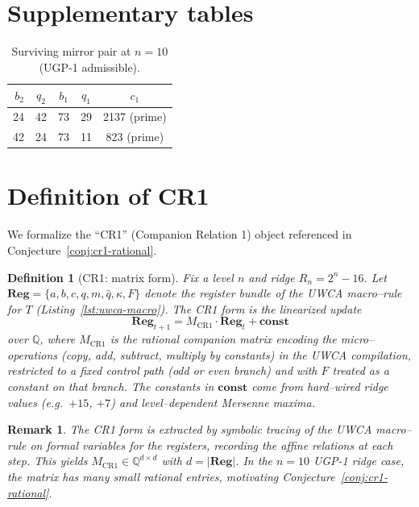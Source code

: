 \documentclass[12pt]{article}
\newtheorem{definition}[theorem]{Definition}
\newtheorem{remark}[theorem]{Remark}
\numberwithin{equation}{section}
\begin{document}
\section{Supplementary tables}\label{app:tables}
\begin{table}[h]
\centering
\renewcommand{\arraystretch}{1.08}
\begin{tabular}{@{}rcccc@{}}
\toprule
$b_2$ & $q_2$ & $b_1$ & $q_1$ & $c_1$ \\
\midrule
24 & 42 & 73 & 29 & 2137 (prime) \\
42 & 24 & 73 & 11 & \phantom{0}823 (prime) \\
\bottomrule
\end{tabular}
\caption{Surviving mirror pair at $n=10$ (UGP-1 admissible).}
\end{table}

\section{Definition of CR1}\label{app:cr1-def}
We formalize the ``CR1'' (Companion Relation 1) object referenced in Conjecture~\ref{conj:cr1-rational}.

\begin{definition}[CR1: matrix form]
Fix a level $n$ and ridge $R_n=2^n-16$. Let $\mathbf{Reg}=\{a,b,c,q,m,\hat{q},\kappa,F\}$ denote the register bundle of the UWCA macro–rule for $T$ (Listing~\ref{lst:uwca-macro}). The \emph{CR1} form is the linearized update
\[
\mathbf{Reg}_{t+1} = M_{\mathrm{CR1}} \cdot \mathbf{Reg}_t + \mathbf{const}
\]
over $\mathbb{Q}$, where $M_{\mathrm{CR1}}$ is the rational companion matrix encoding the micro–operations (copy, add, subtract, multiply by constants) in the UWCA compilation, restricted to a fixed control path (odd or even branch) and with $F$ treated as a constant on that branch. The constants in $\mathbf{const}$ come from hard–wired ridge values (e.g.\ $+15$, $+7$) and level–dependent Mersenne maxima.
\end{definition}

\begin{remark}
The CR1 form is extracted by symbolic tracing of the UWCA macro–rule on formal variables for the registers, recording the affine relations at each step. This yields $M_{\mathrm{CR1}}\in\mathbb{Q}^{d\times d}$ with $d=|\mathbf{Reg}|$. In the $n=10$ UGP-1 ridge case, the matrix has many small rational entries, motivating Conjecture~\ref{conj:cr1-rational}.
\end{remark}
\end{document}
